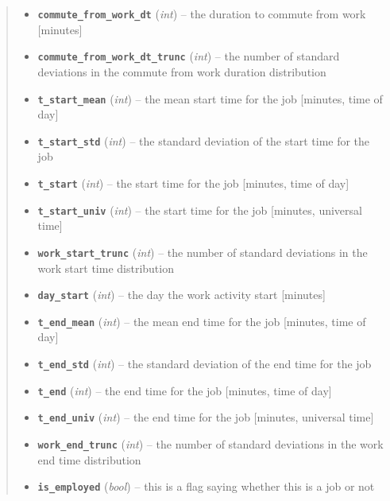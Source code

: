 \documentclass[letterpaper,10pt,english]{sphinxmanual}
\begin{document}
\begin{fulllineitems}
\begin{quote}
\begin{description}
\begin{itemize}
\item {} 
\textbf{\texttt{commute\_from\_work\_dt}} (\emph{int}) -- the duration to commute from work {[}minutes{]}

\item {} 
\textbf{\texttt{commute\_from\_work\_dt\_trunc}} (\emph{int}) -- the number of standard deviations in the commute from work     duration distribution

\item {} 
\textbf{\texttt{t\_start\_mean}} (\emph{int}) -- the mean start time for the job {[}minutes, time of day{]}

\item {} 
\textbf{\texttt{t\_start\_std}} (\emph{int}) -- the standard deviation of the start time for the job

\item {} 
\textbf{\texttt{t\_start}} (\emph{int}) -- the start time for the job {[}minutes, time of day{]}

\item {} 
\textbf{\texttt{t\_start\_univ}} (\emph{int}) -- the start time for the job {[}minutes, universal time{]}

\item {} 
\textbf{\texttt{work\_start\_trunc}} (\emph{int}) -- the number of standard deviations in the work start time distribution

\item {} 
\textbf{\texttt{day\_start}} (\emph{int}) -- the day the work activity start {[}minutes{]}

\item {} 
\textbf{\texttt{t\_end\_mean}} (\emph{int}) -- the mean end time for the job {[}minutes, time of day{]}

\item {} 
\textbf{\texttt{t\_end\_std}} (\emph{int}) -- the standard deviation of the end time for the job

\item {} 
\textbf{\texttt{t\_end}} (\emph{int}) -- the end time for the job {[}minutes, time of day{]}

\item {} 
\textbf{\texttt{t\_end\_univ}} (\emph{int}) -- the end time for the job {[}minutes, universal time{]}

\item {} 
\textbf{\texttt{work\_end\_trunc}} (\emph{int}) -- the number of standard deviations in the work end time distribution

\item {} 
\textbf{\texttt{is\_employed}} (\emph{bool}) -- this is a flag saying whether this is a job or not


\end{itemize}
\end{description}
\end{quote}
\end{fulllineitems}
\end{document}

